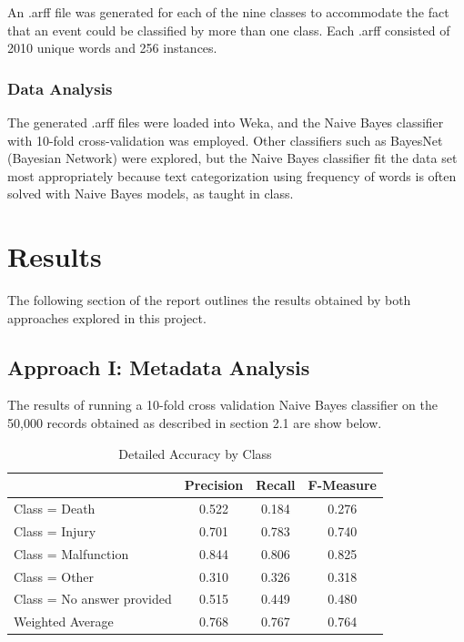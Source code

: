 \documentclass[11pt, notitlepage,abstracton,oneside]{article}   	%
\begin{document}
An .arff file was generated for each of the nine classes to accommodate the fact that an event could be classified by more than one class. Each .arff consisted of 2010 unique words and 256 instances.

\subsubsection{Data Analysis}
The generated .arff files were loaded into Weka, and the Naive Bayes classifier with 10-fold cross-validation was employed. Other classifiers such as BayesNet (Bayesian Network) were explored, but the Naive Bayes classifier fit the data set most appropriately because text categorization using frequency of words is often solved with Naive Bayes models, as taught in class.

\section{Results}
The following section of the report outlines the results obtained by both approaches explored in this project.

\subsection{Approach I: Metadata Analysis}
The results of running a 10-fold cross validation Naive Bayes classifier on the 50,000 records obtained as described in section 2.1 are show below.

\begin{table}[htdp]
\caption{Detailed Accuracy by Class}
\begin{center}
\begin{tabular}{|l|c|c|c|}
\hline
& Precision & Recall & F-Measure \\ \hline
Class = Death & 0.522 & 0.184 & 0.276 \\ \hline
Class = Injury & 0.701 & 0.783 & 0.740 \\ \hline
Class = Malfunction & 0.844 & 0.806 & 0.825 \\ \hline
Class = Other & 0.310 & 0.326 & 0.318 \\ \hline
Class = No answer provided & 0.515 & 0.449 & 0.480 \\ \hline
Weighted Average & 0.768 & 0.767 & 0.764 \\ \hline
\end{tabular}
\end{center}
\label{default}
\end{table}
\end{document}
